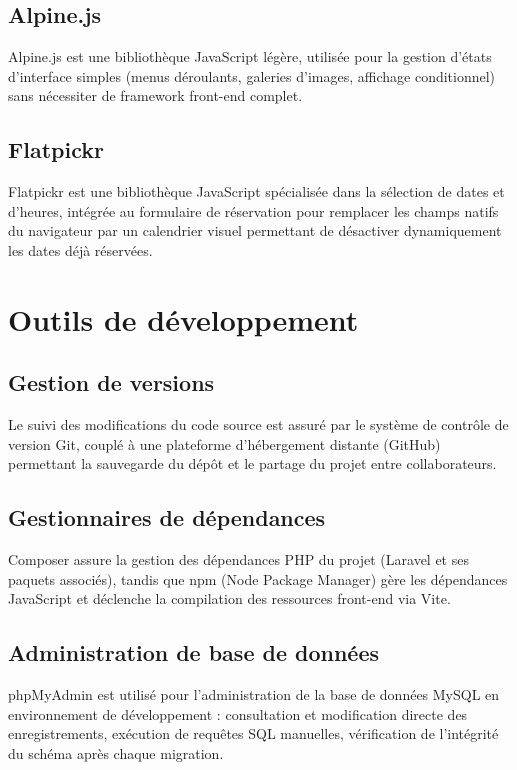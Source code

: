 \documentclass[12pt,a4paper]{report}
\begin{document}
\subsection{Alpine.js}

Alpine.js est une bibliothèque JavaScript légère, utilisée pour la gestion
d'états d'interface simples (menus déroulants, galeries d'images,
affichage conditionnel) sans nécessiter de framework front-end complet.

\subsection{Flatpickr}

Flatpickr est une bibliothèque JavaScript spécialisée dans la sélection de
dates et d'heures, intégrée au formulaire de réservation pour remplacer
les champs natifs du navigateur par un calendrier visuel permettant de
désactiver dynamiquement les dates déjà réservées.

\section{Outils de développement}

\subsection{Gestion de versions}

Le suivi des modifications du code source est assuré par le système de
contrôle de version Git, couplé à une plateforme d'hébergement distante
(GitHub) permettant la sauvegarde du dépôt et le partage du projet entre
collaborateurs.

\subsection{Gestionnaires de dépendances}

Composer assure la gestion des dépendances PHP du projet (Laravel et ses
paquets associés), tandis que npm (Node Package Manager) gère les
dépendances JavaScript et déclenche la compilation des ressources front-end
via Vite.

\subsection{Administration de base de données}

phpMyAdmin est utilisé pour l'administration de la base de données MySQL en
environnement de développement : consultation et modification directe des
enregistrements, exécution de requêtes SQL manuelles, vérification de
l'intégrité du schéma après chaque migration.
\end{document}
